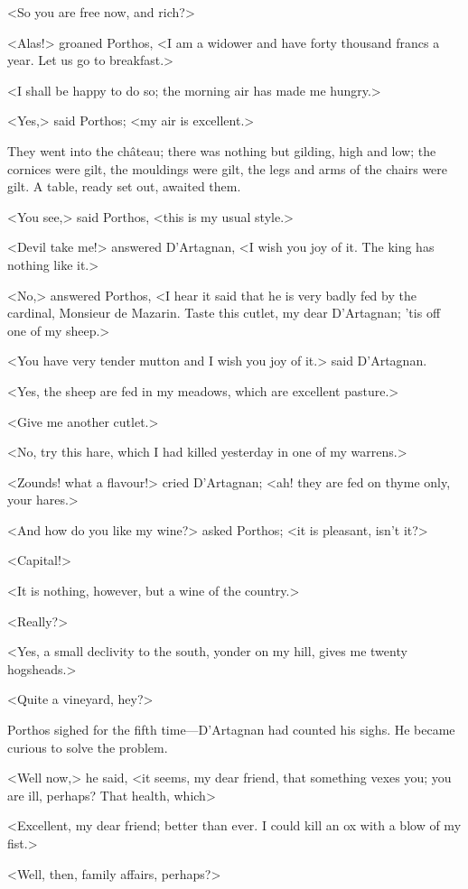 <So you are free now, and rich?>

<Alas!> groaned Porthos, <I am a widower and have forty thousand francs a year. Let us go to breakfast.>

<I shall be happy to do so; the morning air has made me hungry.>

<Yes,> said Porthos; <my air is excellent.>

They went into the château; there was nothing but gilding, high and low; the cornices were gilt, the mouldings were gilt, the legs and arms of the chairs were gilt. A table, ready set out, awaited them.

<You see,> said Porthos, <this is my usual style.>

<Devil take me!> answered D'Artagnan, <I wish you joy of it. The king has nothing like it.>

<No,> answered Porthos, <I hear it said that he is very badly fed by the cardinal, Monsieur de Mazarin. Taste this cutlet, my dear D'Artagnan; 'tis off one of my sheep.>

<You have very tender mutton and I wish you joy of it.> said D'Artagnan.

<Yes, the sheep are fed in my meadows, which are excellent pasture.>

<Give me another cutlet.>

<No, try this hare, which I had killed yesterday in one of my warrens.>

<Zounds! what a flavour!> cried D'Artagnan; <ah! they are fed on thyme only, your hares.>

<And how do you like my wine?> asked Porthos; <it is pleasant, isn't it?>

<Capital!>

<It is nothing, however, but a wine of the country.>

<Really?>

<Yes, a small declivity to the south, yonder on my hill, gives me twenty hogsheads.>

<Quite a vineyard, hey?>

Porthos sighed for the fifth time—D'Artagnan had counted his sighs. He became curious to solve the problem.

<Well now,> he said, <it seems, my dear friend, that something vexes you; you are ill, perhaps? That health, which\longdash>

<Excellent, my dear friend; better than ever. I could kill an ox with a blow of my fist.>

<Well, then, family affairs, perhaps?>

